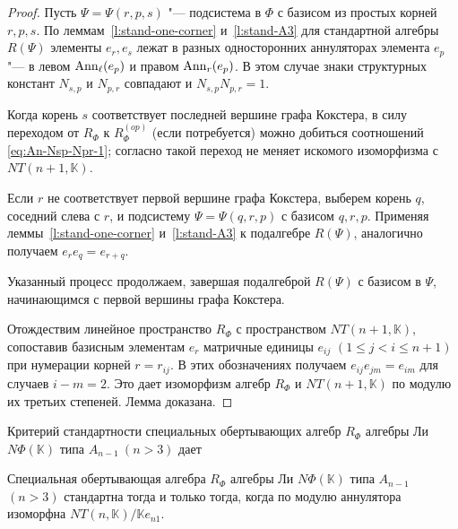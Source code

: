 \documentclass[a4paper,14pt,oneside,openany]{memoir}
\begin{document}
\begin{proof}
    Пусть $\Psi=\Psi(r, p,s)$ "--- подсистема в $\Phi$ с базисом из простых корней
    $r,p,s$. По леммам~\ref{l:stand-one-corner} и~\ref{l:stand-A3} для стандартной
    алгебры $R(\Psi)$ элементы $e_r, e_s$ лежат в разных односторонних аннуляторах
    элемента $e_p$ "--- в левом $\operatorname{Ann}_{\ell}(e_p)$ и правом $\operatorname{Ann}_r(e_p)$. В этом
    случае знаки структурных констант $N_{s,p}$ и $N_{p,r}$ совпадают и
    $N_{s,p}N_{p,r}=1$.

    Когда корень $s$ соответствует последней вершине графа Кокстера, в силу
     переходом от $R_\Phi$ к $R_\Phi^{(op)}$ (если
    потребуется) можно добиться соотношений \eqref{eq:An-Nsp-Npr-1}; согласно
     такой переход не меняет искомого изоморфизма с
    $NT(n+1,\mathbb{K})$.

    \medskip

    Если $r$ не соответствует первой вершине графа Кокстера, выберем корень $q$,
    соседний слева с $r$, и подсистему $\Psi=\Psi (q, r, p)$ с базисом $q, r, p$.
    Применяя леммы~\ref{l:stand-one-corner} и~\ref{l:stand-A3} к подалгебре
    $R(\Psi)$, аналогично получаем $e_re_q = e_{r+q}$.

    Указанный процесс продолжаем, завершая подалгеброй $R(\Psi)$ с базисом в
    $\Psi$, начинающимся с первой вершины графа Кокстера.

    Отождествим линейное пространство $R_\Phi$ с пространством
    $NT(n+1,\mathbb{K})$, сопоставив базисным элементам $e_r$ матричные единицы
    $e_{ij}$ $(1\leq j<i\leq n+1)$ при нумерации корней $r=r_{ij}$. В этих
    обозначениях получаем $e_{ij}e_{jm}=e_{im}$ для случаев $i-m=2$. Это дает
    изоморфизм алгебр $R_\Phi$ и $NT(n+1,\mathbb{K})$ по модулю их третьих
    степеней. Лемма доказана.
\end{proof}

Критерий стандартности специальных обертывающих алгебр $R_\Phi$ алгебры Ли
$N\Phi(\mathbb{K})$ типа $A_{n-1}\ (n>3)$ дает

\begin{theorem}\label{th:Stand-An}
    Специальная обертывающая алгебра $R_\Phi$ алгебры Ли $N\Phi(\mathbb{K})$ типа
    $A_{n-1}$ $(n>3)$ стандартна тогда и только тогда, когда по модулю аннулятора
    изоморфна $NT(n,\mathbb{K})/\mathbb{K}e_{n1}$.
\end{theorem}
\end{document}
